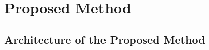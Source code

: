\documentclass[8pt, aspectratio=169, handout]{beamer}
\begin{document}

\section{Proposed Method}

\subsection{Architecture of the Proposed Method}
\end{document}
